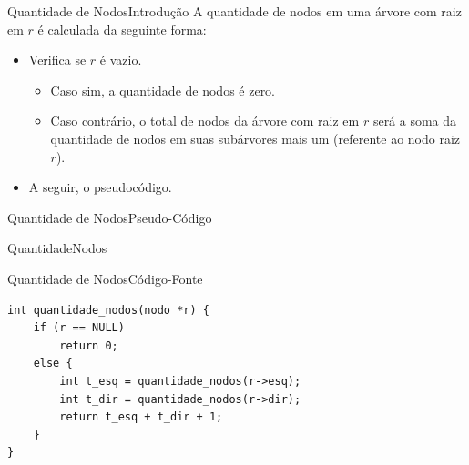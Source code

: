 \documentclass[aspectratio=169]{beamer}
\begin{document}

\begin{frame}[fragile]{Quantidade de Nodos}{Introdução}
A quantidade de nodos em uma árvore com raiz em $r$ é calculada da seguinte forma:
 \begin{itemize}
 \item Verifica se $r$ é vazio. 
 \begin{itemize}
 \item Caso sim, a quantidade de nodos é zero.
 \item Caso contrário, o total de nodos da árvore com raiz em $r$ será a soma da quantidade de nodos em suas subárvores mais um (referente ao nodo raiz $r$).
 \end{itemize} 
 \item A seguir, o pseudocódigo.
 \end{itemize} 
\end{frame}


\begin{frame}[fragile]{Quantidade de Nodos}{Pseudo-Código}
\begin{algorithm}[H]
\caption{QuantidadeNodos} 
\label{QuantidadeNodos}
\end{algorithm}
\end{frame}


\begin{frame}[fragile]{Quantidade de Nodos}{Código-Fonte}
\begin{lstlisting}[style=CStyle,basicstyle=\small]
int quantidade_nodos(nodo *r) {
    if (r == NULL)
        return 0;
    else {
        int t_esq = quantidade_nodos(r->esq);
        int t_dir = quantidade_nodos(r->dir);
        return t_esq + t_dir + 1;
    }
} 
\end{lstlisting}  
\end{frame}
\end{document}
